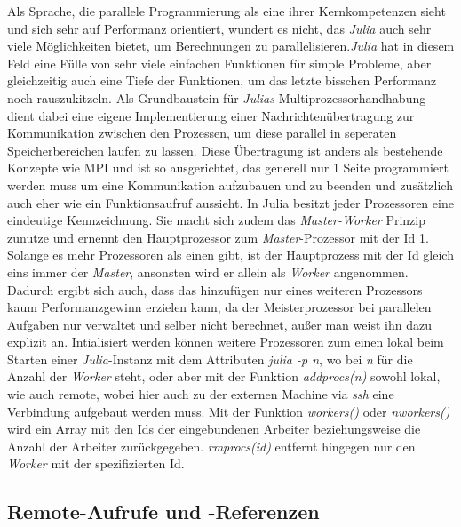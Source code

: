 \documentclass[proseminar,german,utf8]{zihpub}
\begin{document}
Als Sprache, die parallele Programmierung als eine ihrer Kernkompetenzen sieht und sich sehr auf Performanz orientiert, wundert es nicht, das \textit{Julia} auch sehr viele Möglichkeiten bietet, um Berechnungen zu parallelisieren.\textit{Julia} hat in diesem Feld eine Fülle von sehr viele einfachen Funktionen für simple Probleme, aber gleichzeitig auch eine Tiefe der Funktionen, um das letzte bisschen Performanz noch rauszukitzeln. Als Grundbaustein für \textit{Julias} Multiprozessorhandhabung dient dabei eine eigene Implementierung einer Nachrichtenübertragung zur Kommunikation zwischen den Prozessen, um diese parallel in seperaten Speicherbereichen laufen zu lassen. Diese Übertragung ist anders als bestehende Konzepte wie MPI und ist so ausgerichtet, das generell nur 1 Seite programmiert werden muss um eine Kommunikation aufzubauen und zu beenden und zusätzlich auch eher wie ein Funktionsaufruf aussieht. In Julia besitzt jeder Prozessoren eine eindeutige Kennzeichnung. Sie macht sich zudem das \textit{Master-Worker} Prinzip zunutze und ernennt den Hauptprozessor zum \textit{Master}-Prozessor mit der Id 1. Solange es mehr Prozessoren als einen gibt, ist der Hauptprozess mit der Id gleich eins immer der \textit{Master}, ansonsten wird er allein als \textit{Worker} angenommen. Dadurch ergibt sich auch, dass das hinzufügen nur eines weiteren Prozessors kaum Performanzgewinn erzielen kann, da der Meisterprozessor bei parallelen Aufgaben nur verwaltet und selber nicht berechnet, außer man weist ihn dazu explizit an. Intialisiert werden können weitere Prozessoren zum einen lokal beim Starten einer \textit{Julia}-Instanz mit dem Attributen \textit{julia -p n}, wo bei \textit{n} für die Anzahl der \textit{Worker} steht, oder aber mit der Funktion \textit{addprocs(n)} sowohl lokal, wie auch remote, wobei hier auch zu der externen Machine via \textit{ssh} eine Verbindung aufgebaut werden muss. Mit der Funktion \textit{workers()} oder \textit{nworkers()} wird ein Array mit den Ids der eingebundenen Arbeiter beziehungsweise die Anzahl der Arbeiter zurückgegeben. \textit{rmprocs(id)} entfernt hingegen nur den \textit{Worker} mit der spezifizierten Id.

\subsection{Remote-Aufrufe und -Referenzen}
\end{document}
